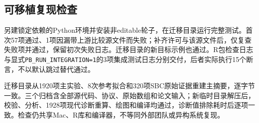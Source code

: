 \subsection{可移植复现检查}
另建锁定依赖的Python环境并安装非editable轮子，在迁移目录运行完整测试。首次57项通过、1项因漏带上游比较源文件而失败；补齐许可与该源文件后，仅复查失败项并通过，保留初次失败日志。迁移目录的新目标示例也通过。R包检查日志与显式\texttt{PB\_RUN\_INTEGRATION=1}的3项集成测试日志分别交付，后者实际执行15个断言，不以默认跳过替代通过。

迁移目录从1920项主实验、8次参考拟合和320项SBC原始证据重建主摘要，逐字节一致。三个归档含全部源代码、协议、原始数组和论文输入；新临时目录解压后，校验、分析、1928项现代诊断重算、绘图和编译均通过，诊断值排除耗时后逐项一致。检查仍共享Mac、R库和编译器，不等同外部团队或异构系统复现。

